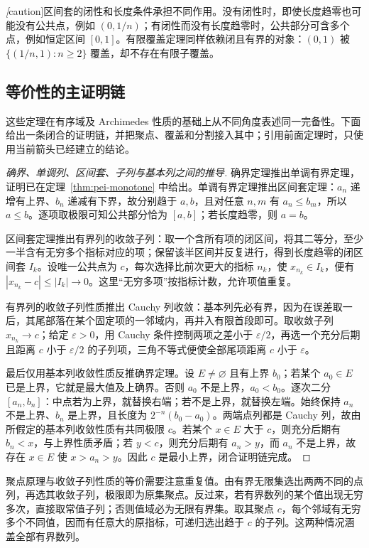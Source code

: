 \emph[caution]{区间套的闭性和长度条件承担不同作用。}没有闭性时，即使长度趋零也可能没有公共点，例如 $(0,1/n)$；有闭性而没有长度趋零时，公共部分可含多个点，例如恒定区间 $[0,1]$。有限覆盖定理同样依赖闭且有界的对象：$(0,1)$ 被 $\{(1/n,1):n\ge2\}$ 覆盖，却不存在有限子覆盖。

\subsection{等价性的主证明链}

这些定理在有序域及 Archimedes 性质的基础上从不同角度表述同一完备性。下面给出一条闭合的证明链，并把聚点、覆盖和分割接入其中；引用前面定理时，只使用当前箭头已经建立的结论。

\begin{proof}[确界、单调列、区间套、子列与基本列之间的推导]
确界定理推出单调有界定理，证明已在定理~\ref{thm:pei-monotone} 中给出。单调有界定理推出区间套定理：$a_n$ 递增有上界、$b_n$ 递减有下界，故分别趋于 $a,b$，且对任意 $n,m$ 有 $a_n\le b_m$，所以 $a\le b$。逐项取极限可知公共部分恰为 $[a,b]$；若长度趋零，则 $a=b$。

区间套定理推出有界列的收敛子列：取一个含所有项的闭区间，将其二等分，至少一半含有无穷多个指标对应的项；保留该半区间并反复进行，得到长度趋零的闭区间套 $I_k$。设唯一公共点为 $c$，每次选择比前次更大的指标 $n_k$，使 $x_{n_k}\in I_k$，便有 $|x_{n_k}-c|\le|I_k|\to0$。这里“无穷多项”按指标计数，允许项值重复。

有界列的收敛子列性质推出 Cauchy 列收敛：基本列先必有界，因为在误差取一后，其尾部落在某个固定项的一邻域内，再并入有限首段即可。取收敛子列 $x_{n_k}\to c$；给定 $\varepsilon>0$，用 Cauchy 条件控制两项之差小于 $\varepsilon/2$，再选一个充分后期且距离 $c$ 小于 $\varepsilon/2$ 的子列项，三角不等式便使全部尾项距离 $c$ 小于 $\varepsilon$。

最后仅用基本列收敛性质反推确界定理。设 $E\ne\varnothing$ 且有上界 $b_0$；若某个 $a_0\in E$ 已是上界，它就是最大值及上确界。否则 $a_0$ 不是上界，$a_0<b_0$。逐次二分 $[a_n,b_n]$：中点若为上界，就替换右端；若不是上界，就替换左端。始终保持 $a_n$ 不是上界、$b_n$ 是上界，且长度为 $2^{-n}(b_0-a_0)$。两端点列都是 Cauchy 列，故由所假定的基本列收敛性质有共同极限 $c$。若某个 $x\in E$ 大于 $c$，则充分后期有 $b_n<x$，与上界性质矛盾；若 $y<c$，则充分后期有 $a_n>y$，而 $a_n$ 不是上界，故存在 $x\in E$ 使 $x>a_n>y$。因此 $c$ 是最小上界，闭合证明链完成。
\end{proof}

聚点原理与收敛子列性质的等价需要注意重复值。由有界无限集选出两两不同的点列，再选其收敛子列，极限即为原集聚点。反过来，若有界数列的某个值出现无穷多次，直接取常值子列；否则值域必为无限有界集。取其聚点 $c$，每个邻域有无穷多个不同值，因而有任意大的原指标，可递归选出趋于 $c$ 的子列。这两种情况涵盖全部有界数列。

